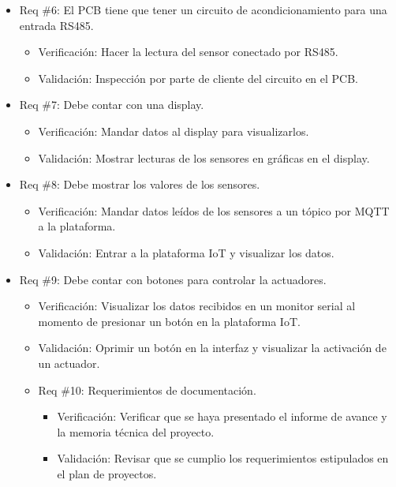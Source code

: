\documentclass[
11pt, %
codirector, %
]{charter}
\begin{document}
\begin{itemize}
	\item Req \#6: El PCB tiene que tener un circuito de acondicionamiento para una entrada RS485.
	\begin{itemize}
		\item Verificación: Hacer la lectura del sensor conectado por RS485.
		\item Validación: Inspección por parte de cliente del circuito en el PCB.  
	\end{itemize}

	\item Req \#7: Debe contar con una display.
	\begin{itemize}
		\item Verificación: Mandar datos al display para visualizarlos.
		\item Validación: Mostrar lecturas de los sensores en gráficas en el display.  
	\end{itemize}

	\item Req \#8: Debe mostrar los valores de los sensores.
	\begin{itemize}
		\item Verificación: Mandar datos leídos de los sensores a un tópico por MQTT a la plataforma.
		\item Validación: Entrar a la plataforma IoT y visualizar los datos. 
	\end{itemize}

	\item Req \#9: Debe contar con botones para controlar la actuadores.
	\begin{itemize}
		\item Verificación: Visualizar los datos recibidos en un monitor serial al momento de presionar un botón en la plataforma IoT.
		\item Validación: Oprimir un botón en la interfaz y visualizar la activación de un actuador. 

	\item Req \#10: Requerimientos de documentación.
	\begin{itemize}
		\item Verificación: Verificar que se haya presentado el informe de avance y la memoria técnica del proyecto.
		\item Validación: Revisar que se cumplio los requerimientos estipulados en el plan de proyectos. 
	\end{itemize}
\end{itemize}
\end{itemize}
\end{document}
